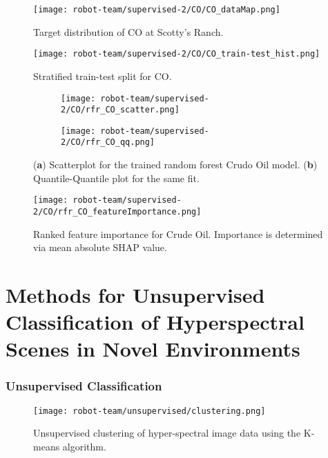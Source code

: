\begin{figure}[h]
\texttt{[image: robot-team/supervised-2/CO/CO\_dataMap.png]}
\caption{Target distribution of CO at Scotty's Ranch.\label{CO_targetMap}}
\end{figure}

\begin{figure}[h]
\texttt{[image: robot-team/supervised-2/CO/CO\_train-test\_hist.png]}
\caption{Stratified train-test split for CO.\label{CO_trainTestHist}}
\end{figure}

\begin{figure}[h]
  \begin{subfigure}{0.5\textwidth}
    \centering
    \texttt{[image: robot-team/supervised-2/CO/rfr\_CO\_scatter.png]}
  \end{subfigure}
  \begin{subfigure}{0.5\textwidth}
    \centering
    \texttt{[image: robot-team/supervised-2/CO/rfr\_CO\_qq.png]}
  \end{subfigure}
  \caption{(\textbf{a}) Scatterplot for the trained random forest Crudo Oil model. (\textbf{b}) Quantile-Quantile plot for the same fit.}
  \label{CO_fitresult}
\end{figure}



\begin{figure}[h]
    \texttt{[image: robot-team/supervised-2/CO/rfr\_CO\_featureImportance.png]}
    \caption{Ranked feature importance for Crude Oil. Importance is determined via mean absolute SHAP value. \label{CO_shapely}}
\end{figure}






\section{Methods for Unsupervised Classification of Hyperspectral Scenes in Novel Environments}

\subsubsection{Unsupervised Classification}
\begin{figure}[h]
  \texttt{[image: robot-team/unsupervised/clustering.png]}
  \caption{Unsupervised clustering of hyper-spectral image data using the K-means algorithm.\label{clustering}}
\end{figure}



